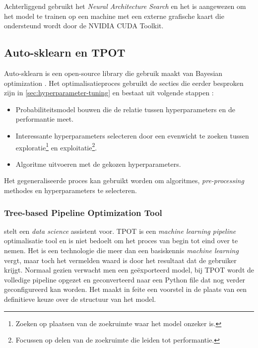 Achterliggend gebruikt het \textit{Neural Architecture Search} en het is aangewezen om het model te trainen op een machine met een externe grafische kaart die ondersteund wordt door de NVIDIA CUDA Toolkit.

\subsection{Auto-sklearn en TPOT}
\label{subsec:autosk}

Auto-sklearn is een open-source library die gebruik maakt van Bayesian optimization \autocite{Feurer2015}. Het optimalisatieproces gebruikt de secties die eerder besproken zijn in \ref{sec:hyperparameter-tuning} en bestaat uit volgende stappen \autocite{Feurer2016}: 

\begin{itemize}
    \item Probabiliteitsmodel bouwen die de relatie tussen hyperparameters en de performantie meet.
    \item Interessante hyperparameters selecteren door een evenwicht te zoeken tussen exploratie\footnote{Zoeken op plaatsen van de zoekruimte waar het model onzeker is.} en exploitatie\footnote{Focussen op delen van de zoekruimte die leiden tot performantie.}.
    \item Algoritme uitvoeren met de gekozen hyperparameters.
\end{itemize}

Het gegeneraliseerde proces kan gebruikt worden om algoritmes, \textit{pre-processing} methodes en hyperparameters te selecteren.

\subsubsection{Tree-based Pipeline Optimization Tool}

\textcite{Olson2016} stelt een \textit{data science} assistent voor. TPOT is een \textit{machine learning pipeline} optimalisatie tool en is niet bedoelt om het proces van begin tot eind over te nemen. Het is een technologie die meer dan een basiskennis \textit{machine learning} vergt, maar toch het vermelden waard is door het resultaat dat de gebruiker krijgt. Normaal gezien verwacht men een geëxporteerd model, bij TPOT wordt de volledige pipeline opgezet en geconverteerd naar een Python file dat nog verder geconfigureerd kan worden. Het maakt in feite een voorstel in de plaats van een definitieve keuze over de structuur van het model. 

